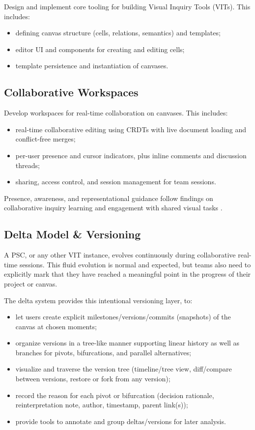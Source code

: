 \documentclass[11pt,a4paper]{article}
\begin{document}
Design and implement core tooling for building Visual Inquiry Tools (VITs). This includes:
\begin{itemize}
  \item defining canvas structure (cells, relations, semantics) and templates;
  \item editor UI and components for creating and editing cells;
  \item template persistence and instantiation of canvases.
\end{itemize}

\subsection{Collaborative Workspaces}

Develop workspaces for real-time collaboration on canvases. This includes:
\begin{itemize}
  \item real-time collaborative editing using CRDTs with live document loading and conflict-free merges;
  \item per-user presence and cursor indicators, plus inline comments and discussion threads;
  \item sharing, access control, and session management for team sessions.
\end{itemize}

Presence, awareness, and representational guidance follow findings on collaborative inquiry learning and engagement with shared visual tasks \citep{kolloffel2011comparing,chen2020collaborative,chen2021large}.

\subsection{Delta Model \& Versioning}

A PSC, or any other VIT instance, evolves continuously during collaborative real-time sessions. This fluid evolution is normal and expected, but teams also need to explicitly mark that they have reached a meaningful point in the progress of their project or canvas.

The delta system provides this intentional versioning layer, to:
\begin{itemize}
  \item let users create explicit milestones/versions/commits (snapshots) of the canvas at chosen moments;
  \item organize versions in a tree-like manner supporting linear history as well as branches for pivots, bifurcations, and parallel alternatives;
  \item visualize and traverse the version tree (timeline/tree view, diff/compare between versions, restore or fork from any version);
  \item record the reason for each pivot or bifurcation (decision rationale, reinterpretation note, author, timestamp, parent link(s));
  \item provide tools to annotate and group deltas/versions for later analysis.
\end{itemize}
\end{document}
